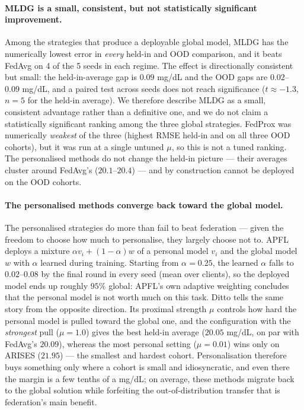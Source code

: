 \documentclass[10pt,letterpaper]{article}
\begin{document}
\paragraph{MLDG is a small, consistent, but not statistically significant
improvement.} Among the strategies that produce a deployable global model, MLDG
has the numerically lowest error in \emph{every} held-in and OOD comparison, and
it beats FedAvg on 4 of the 5 seeds in each regime. The effect is directionally
consistent but small: the held-in-average gap is $0.09$ mg/dL and the OOD gaps
are $0.02$--$0.09$ mg/dL, and a paired test across seeds does not reach
significance ($t \approx -1.3$, $n=5$ for the held-in average). We therefore
describe MLDG as a small, consistent advantage rather than a definitive one, and
we do not claim a statistically significant ranking among the three global
strategies. FedProx was numerically \emph{weakest} of the three (highest RMSE
held-in and on all three OOD cohorts), but it was run at a single untuned $\mu$,
so this is not a tuned ranking. The personalised methods do not change the
held-in picture --- their averages cluster around FedAvg's ($20.1$--$20.4$) ---
and by construction cannot be deployed on the OOD cohorts.

\paragraph{The personalised methods converge back toward the global model.} The
personalised strategies do more than fail to beat federation --- given the freedom
to choose how much to personalise, they largely choose not to. APFL deploys a
mixture $\alpha v_i + (1-\alpha) w$ of a personal model $v_i$ and the global model
$w$ with $\alpha$ learned during training. Starting from $\alpha = 0.25$, the
learned $\alpha$ falls to $0.02$--$0.08$ by the final round in every seed
(mean over clients), so the deployed model ends up roughly $95\%$ global: APFL's
own adaptive weighting concludes that the personal model is not worth much on this
task. Ditto tells the same story from the opposite direction. Its proximal
strength $\mu$ controls how hard the personal model is pulled toward the global
one, and the configuration with the \emph{strongest} pull ($\mu = 1.0$) gives the
best held-in average ($20.05$ mg/dL, on par with FedAvg's $20.09$), whereas the
most personal
setting ($\mu = 0.01$) wins only on ARISES ($21.95$) --- the smallest and hardest
cohort. Personalisation therefore buys something only where a cohort is small and
idiosyncratic, and even there the margin is a few tenths of a mg/dL; on average,
these methods migrate back to the global solution while forfeiting the
out-of-distribution transfer that is federation's main benefit.
\end{document}
